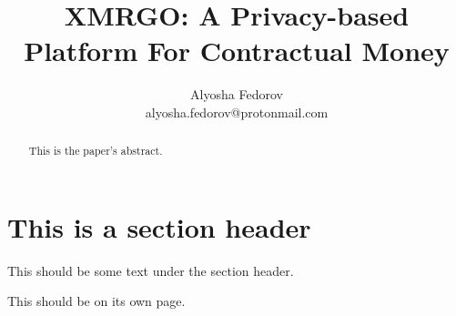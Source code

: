 \documentclass{article}
\title{XMRGO: A Privacy-based Platform For Contractual Money}
\author{
    Alyosha Fedorov\\
    alyosha.fedorov@protonmail.com
}
\date{}
\begin{document}
 

\maketitle 

\begin{abstract}
    This is the paper's abstract.
\end{abstract}

\section*{This is a section header}

This should be some text under the section header.

\clearpage

\noindent This should be on its own page.
\end{document}
